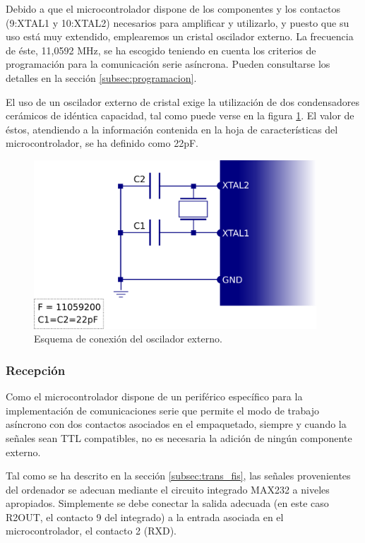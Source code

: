 Debido a que el microcontrolador dispone de los componentes y los contactos\cite{atmega48} (9:XTAL1 y 10:XTAL2) necesarios para amplificar y utilizarlo, y puesto que su uso está muy extendido, emplearemos un cristal oscilador externo. La frecuencia de éste, 11,0592 MHz, se ha escogido teniendo en cuenta los criterios de programación para la comunicación serie asíncrona. Pueden consultarse los detalles en la sección \ref{subsec:programacion}.

El uso de un oscilador externo de cristal exige la utilización de dos condensadores cerámicos de idéntica capacidad, tal como puede verse en la figura \ref{fig:esq_osc}. El valor de éstos, atendiendo a la información contenida en la hoja de características del microcontrolador\cite{atmega48}, se ha definido como 22pF.

\begin{figure}[!htp]
\centering
\includegraphics[width=300pt]{./images/esq_osc.png}
\caption{Esquema de conexión del oscilador externo.}
\label{fig:esq_osc}
\end{figure}

\subsubsection{Recepción}

Como el microcontrolador dispone de un periférico específico para la implementación de comunicaciones serie que permite el modo de trabajo asíncrono con dos contactos asociados en el empaquetado, siempre y cuando la señales sean TTL compatibles, no es necesaria la adición de ningún componente externo.

Tal como se ha descrito en la sección \ref{subsec:trans_fis}, las señales provenientes del ordenador se adecuan mediante el circuito integrado MAX232\cite{max232} a niveles apropiados. Simplemente se debe conectar la salida adecuada (en este caso R2OUT, el contacto 9 del integrado) a la entrada asociada en el microcontrolador, el contacto 2 (RXD).

